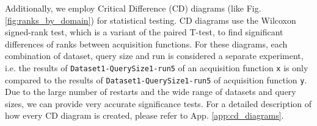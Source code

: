 \documentclass[]{article}
\begin{document}
Additionally, we employ Critical Difference (CD) diagrams (like Fig. \ref{fig:ranks_by_domain}) for statistical testing.
CD diagrams use the Wilcoxon signed-rank test, which is a variant of the paired T-test, to find significant differences of ranks between acquisition functions.
For these diagrams, each combination of dataset, query size and run is considered a separate experiment, i.e. the results of \verb|Dataset1-QuerySize1-run5| of an acquisition function \verb|x| is only compared to the results of \verb|Dataset1-QuerySize1-run5| of acquisition function \verb|y|.
Due to the large number of restarts and the wide range of datasets and query sizes, we can provide very accurate significance tests.
For a detailed description of how every CD diagram is created, please refer to App. \ref{app:cd_diagrams}. 


\end{document}
